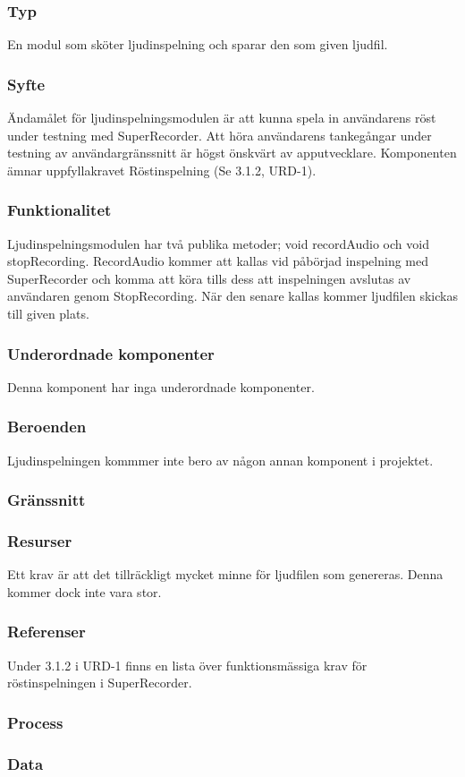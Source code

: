 \subsubsection{Typ}
En modul som sköter ljudinspelning och sparar den som given ljudfil.

\subsubsection{Syfte}
Ändamålet för ljudinspelningsmodulen är att kunna spela in användarens röst under testning med SuperRecorder. Att höra användarens tankegångar under testning av användargränssnitt är högst önskvärt av apputvecklare. Komponenten ämnar uppfyllakravet Röstinspelning (Se 3.1.2, URD-1).

\subsubsection{Funktionalitet}
Ljudinspelningsmodulen har två publika metoder; void recordAudio och void stopRecording. RecordAudio kommer att kallas vid påbörjad inspelning med SuperRecorder och komma att köra tills dess att inspelningen avslutas av användaren genom StopRecording. När den senare kallas kommer ljudfilen skickas till given plats.

\subsubsection{Underordnade komponenter}
Denna komponent har inga underordnade komponenter.

\subsubsection{Beroenden}
Ljudinspelningen kommmer inte bero av någon annan komponent i projektet.

\subsubsection{Gränssnitt}

\subsubsection{Resurser}
Ett krav är att det tillräckligt mycket minne för ljudfilen som genereras. Denna kommer dock inte vara stor.

\subsubsection{Referenser}
Under 3.1.2 i URD-1 finns en lista över funktionsmässiga krav för röstinspelningen i SuperRecorder.

\subsubsection{Process}

\subsubsection{Data}

